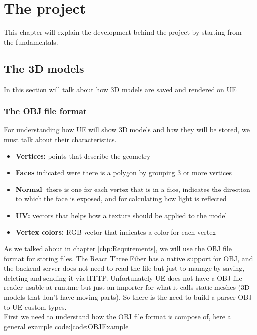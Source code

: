 
\chapter{The project}
\label{chp:project}
\noindent
This chapter will explain the development behind the project by starting from the fundamentals.
\section{The 3D models}
\noindent
In this section will talk about how 3D models are saved and rendered on \ac{UE}
\subsection{The OBJ file format}
\noindent
For understanding how \ac{UE} will show 3D models and how they will be stored, we must talk about their characteristics.

\begin{itemize}
    \item \textbf{Vertices:} points that describe the geometry
    \item \textbf{Faces} indicated were there is a polygon by grouping 3 or more vertices 
    \item \textbf{Normal:} there is one for each vertex that is in a face, indicates the direction to which the face is exposed, and for calculating how light is reflected
    \item \textbf{UV:} vectors that helps how a texture should be applied to the model
    \item \textbf{Vertex colors:} RGB vector that indicates a color for each vertex
\end{itemize}
\noindent
As we talked about in chapter \ref{chp:Requirements}, we will use the OBJ file format for storing files.
The React Three Fiber has a native support for OBJ, and the backend server does not need to read the file but just to manage by saving, deleting and sending it via \ac{HTTP}.
Unfortunately \ac{UE} does not have a OBJ file reader usable at runtime but just an importer for what it calls static meshes (3D models that don't have moving parts).
So there is the need to build a parser OBJ to \ac{UE} custom types.\\
First we need to understand how the OBJ file format is compose of, here a general example code:\ref{code:OBJExample}

